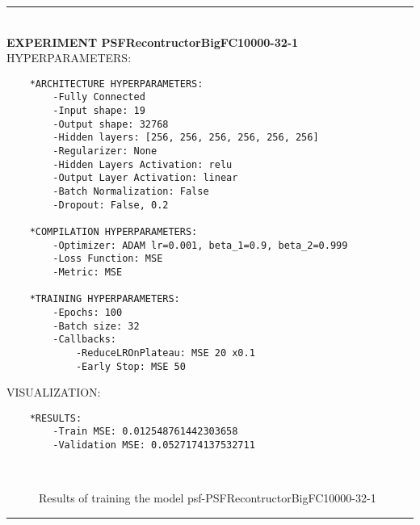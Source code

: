 \rule{0.5\textwidth}{0.5pt}\\

	{\large \textbf{EXPERIMENT PSFRecontructorBigFC10000-32-1}}\\
	
	{\normalsize HYPERPARAMETERS:}
	\begin{lstlisting}	
	*ARCHITECTURE HYPERPARAMETERS:
		-Fully Connected
		-Input shape: 19
		-Output shape: 32768
		-Hidden layers: [256, 256, 256, 256, 256, 256]
		-Regularizer: None
		-Hidden Layers Activation: relu
		-Output Layer Activation: linear
		-Batch Normalization: False
		-Dropout: False, 0.2
	
	*COMPILATION HYPERPARAMETERS:
		-Optimizer: ADAM lr=0.001, beta_1=0.9, beta_2=0.999
		-Loss Function: MSE
		-Metric: MSE
	
	*TRAINING HYPERPARAMETERS:
		-Epochs: 100
		-Batch size: 32
		-Callbacks: 
			-ReduceLROnPlateau: MSE 20 x0.1
			-Early Stop: MSE 50
	\end{lstlisting}
	
	{\normalsize VISUALIZATION:}
	\begin{lstlisting}
	*RESULTS:
        -Train MSE: 0.012548761442303658
        -Validation MSE: 0.0527174137532711
	\end{lstlisting}
	
	\begin{figure*}[ht!]
		\hspace{\fill}
		\hspace{\fill}
		\\
		\caption{Results of training the model psf-PSFRecontructorBigFC10000-32-1}
	\end{figure*}
	
\FloatBarrier	
\rule{0.5\textwidth}{0.5pt}\\